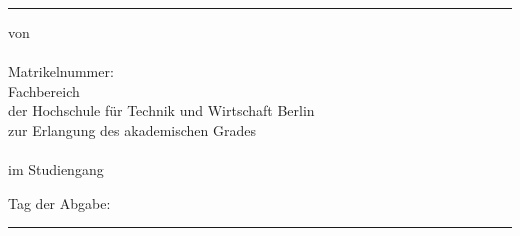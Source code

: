 {      \textcolor{HKS66}{\rule{\linewidth}{.4mm}}
      \begin{center}
        \begin{hsheadfont}
          \textcolor{\headcolor}{\LARGE \textbf{\thetitel}}
        \end{hsheadfont}
      \end{center}
      \begin{hsheadfont}
        \begin{center}
          \textbf{\Large{\thethesistyp}}
        \end{center}
      \end{hsheadfont}
      \begin{center}
        \begin{hsfont}
          von\\[2ex]
          {\textbf{\large\theautor}}\\[2ex]
          Matrikelnummer: \thematrikelnr\\[2ex]
          Fachbereich \thefachbereich\\
          der Hochschule für Technik und Wirtschaft Berlin\\[2ex]
          zur Erlangung des akademischen Grades\\
          \textbf{\theabschluss}\\
          im Studiengang\\
          \textbf{\thestudiengang}
        \end{hsfont}
      \end{center}
     
       \begin{center}
         Tag der Abgabe: \thedatum 
       \end{center}
         
      
      \thebetreuerFeld
      

      \textcolor{HKS66}{\rule{\linewidth}{0.4mm}}\\[1.5ex]
       \begin{hsheadfont}
         ~\hfill~
       \end{hsheadfont}
    }
    
